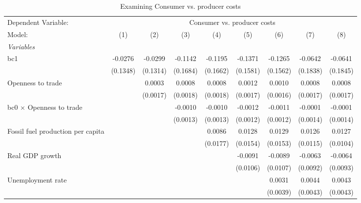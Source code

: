
\begin{table}[htbp]
   \caption{Examining Consumer vs. producer costs}
   \centering
   \begin{tabular}{lcccccccc}
      \tabularnewline \midrule \midrule
      Dependent Variable: & \multicolumn{8}{c}{Consumer vs. producer costs}\\
      Model:                                  & (1)      & (2)      & (3)      & (4)      & (5)      & (6)      & (7)      & (8)\\  
      \midrule
      \emph{Variables}\\
      bc1                                     & -0.0276  & -0.0299  & -0.1142  & -0.1195  & -0.1371  & -0.1265  & -0.0642  & -0.0641\\   
                                              & (0.1348) & (0.1314) & (0.1684) & (0.1662) & (0.1581) & (0.1562) & (0.1838) & (0.1845)\\   
      Openness to trade                       &          & 0.0003   & 0.0008   & 0.0008   & 0.0012   & 0.0010   & 0.0008   & 0.0008\\   
                                              &          & (0.0017) & (0.0018) & (0.0018) & (0.0017) & (0.0016) & (0.0017) & (0.0017)\\   
      bc0 $\times$ Openness to trade          &          &          & -0.0010  & -0.0010  & -0.0012  & -0.0011  & -0.0001  & -0.0001\\   
                                              &          &          & (0.0013) & (0.0013) & (0.0012) & (0.0012) & (0.0014) & (0.0014)\\   
      Fossil fuel production per capita       &          &          &          & 0.0086   & 0.0128   & 0.0129   & 0.0126   & 0.0127\\   
                                              &          &          &          & (0.0177) & (0.0154) & (0.0153) & (0.0115) & (0.0104)\\   
      Real GDP growth                         &          &          &          &          & -0.0091  & -0.0089  & -0.0063  & -0.0064\\   
                                              &          &          &          &          & (0.0106) & (0.0107) & (0.0092) & (0.0093)\\   
      Unemployment rate                       &          &          &          &          &          & 0.0031   & 0.0044   & 0.0043\\   
                                              &          &          &          &          &          & (0.0039) & (0.0043) & (0.0043)\\   

\end{tabular}
\end{table}
